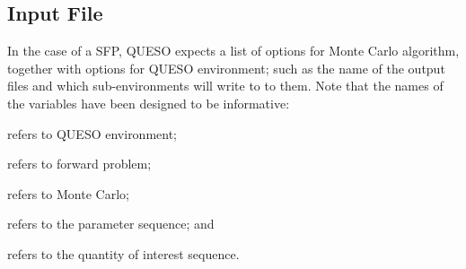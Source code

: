 








 


\subsection{Input File}\label{sec:sfp-input-file}

In the case of a SFP, QUESO expects a list of options for Monte Carlo algorithm,
together with options for QUESO environment; such as the name of the output files and which sub-environments will write to to them. 
Note that the names of the variables have been designed to be informative:
\begin{description}\vspace{-8pt}
\item[ \texttt{env}:] refers to QUESO environment; \vspace{-8pt}
\item[ \texttt{fp}:] refers to forward problem;\vspace{-8pt}
\item[ \texttt{mc}:] refers to Monte Carlo;\vspace{-8pt}
\item[ \texttt{pseq}:] refers to the parameter sequence; and\vspace{-8pt}
\item[ \texttt{qseq}:] refers to the quantity of interest sequence.
\end{description}

